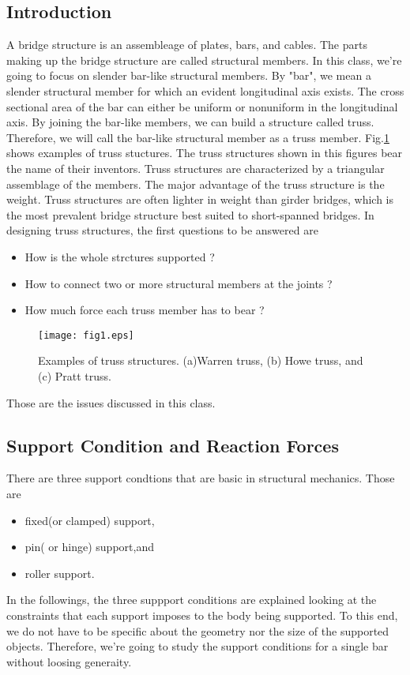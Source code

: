 \documentclass[10pt,a4j]{article}
\begin{document}
\subsection{Introduction}
A bridge structure is an assembleage of plates, bars, and cables.
The parts making up the bridge structure are called structural members.
In this class, we're going to focus on slender bar-like structural members. 
By "bar", we mean a slender structural member for which an evident longitudinal 
axis exists. The cross sectional area of the bar can either be uniform or 
nonuniform in the longitudinal axis. By joining the bar-like members, we can 
build a structure called truss. Therefore, we will call the bar-like structural 
member as a truss member. Fig.\ref{fig:fig1} shows examples of truss stuctures. 
The truss structures shown in this figures bear the name of their inventors. 
Truss structures are characterized by a triangular assemblage of the members. 
The major advantage of the truss structure is the weight. 
Truss structures are often lighter in weight than girder bridges, which 
is the most prevalent bridge structure best suited to short-spanned bridges.
In designing truss structures, the first questions to be answered are
\begin{itemize}
\item
	How is the whole strctures supported ?
\item
	How to connect two or more structural members at the joints ?
\item
	How much force each truss member has to bear ?
\end{itemize}
\begin{figure}[h]
	\begin{center}
	\texttt{[image: fig1.eps]} 
	\end{center}
	\caption{Examples of truss structures. (a)Warren truss, (b) Howe truss, and (c) Pratt truss.} 
	\label{fig:fig1}
\end{figure}
Those are the issues discussed in this class. 
\subsection{Support Condition and Reaction Forces}
There are three support condtions that are basic in structural mechanics. 
Those are 
\begin{itemize}
\item
	fixed(or clamped) support,
\item
	pin( or hinge) support,and 
\item
	roller support.
\end{itemize}
In the followings, the three suppport conditions are explained
looking at the constraints that each support imposes to the 
body being supported. To this end, we do not have to be specific about the 
geometry nor the size of the supported objects. Therefore, we're going to 
study the support conditions for a single bar without loosing generaity.
\end{document}
